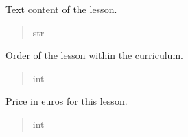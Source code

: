 \documentclass[letterpaper,10pt,english]{sphinxmanual}
\begin{document}
\begin{fulllineitems}
\begin{fulllineitems}
\label{\detokenize{courses:courses.models.Lesson.content}}
\pysigstartsignatures
\pysigline
{}
\pysigstopsignatures
\sphinxAtStartPar
Text content of the lesson.
\begin{quote}\begin{description}
\sphinxAtStartPar
str

\end{description}\end{quote}

\end{fulllineitems}


\begin{fulllineitems}
\label{\detokenize{courses:courses.models.Lesson.order}}
\pysigstartsignatures
\pysigline
{}
\pysigstopsignatures
\sphinxAtStartPar
Order of the lesson within the curriculum.
\begin{quote}\begin{description}
\sphinxAtStartPar
int

\end{description}\end{quote}

\end{fulllineitems}


\begin{fulllineitems}
\label{\detokenize{courses:courses.models.Lesson.price}}
\pysigstartsignatures
\pysigline
{}
\pysigstopsignatures
\sphinxAtStartPar
Price in euros for this lesson.
\begin{quote}\begin{description}
\sphinxAtStartPar
int

\end{description}\end{quote}

\end{fulllineitems}



\end{fulllineitems}
\end{document}

